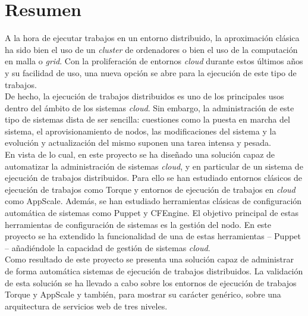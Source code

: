 \chapter{Resumen}
\label{cap:resumen}


A la hora de ejecutar trabajos en un entorno distribuido, la aproximación clásica ha sido bien el uso de un \emph{cluster} de ordenadores o bien el uso de la computación en malla o \emph{grid}. Con la proliferación de entornos \emph{cloud} durante estos últimos años y su facilidad de uso, una nueva opción se abre para la ejecución de este tipo de trabajos.\\

De hecho, la ejecución de trabajos distribuidos es uno de los principales usos dentro del ámbito de los sistemas \emph{cloud}. Sin embargo, la administración de este tipo de sistemas dista de ser sencilla: cuestiones como la puesta en marcha del sistema, el aprovisionamiento de nodos, las modificaciones del sistema y la evolución y actualización del mismo suponen una tarea intensa y pesada.\\

En vista de lo cual, en este proyecto se ha diseñado una solución capaz de automatizar la administración de sistemas \emph{cloud}, y en particular de un sistema de ejecución de trabajos distribuidos. Para ello se han estudiado entornos clásicos de ejecución de trabajos como Torque y entornos de ejecución de trabajos en \emph{cloud} como AppScale. Además, se han estudiado herramientas clásicas de configuración automática de sistemas como Puppet y CFEngine. El objetivo principal de estas herramientas de configuración de sistemas es la gestión del nodo. En este proyecto se ha extendido la funcionalidad de una de estas herramientas -- Puppet -- añadiéndole la capacidad de gestión de sistemas \emph{cloud}.\\

Como resultado de este proyecto se presenta una solución capaz de administrar de forma automática sistemas de ejecución de trabajos distribuidos. La validación de esta solución se ha llevado a cabo sobre los entornos de ejecución de trabajos Torque y AppScale y también, para mostrar su carácter genérico, sobre una arquitectura de servicios web de tres niveles.
